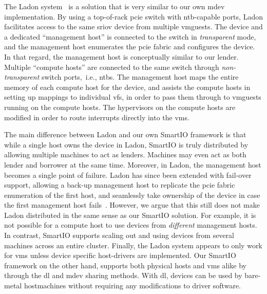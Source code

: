 The Ladon system~\cite{Tu2013} is a solution that is very similar to our own \gls{mdev} implementation.
%
By using a top-of-rack \gls{pcie} switch with \gls{ntb}-capable ports, Ladon facilitates access to the same \gls{sriov} device from multiple \glspl{vmguest}. 
%
The device and a dedicated ``management host'' is connected to the switch in \emph{transparent} mode, and the management host enumerates the \gls{pcie} fabric and configures the device.
%
In that regard, the management host is conceptually similar to our \gls{lender}.
%
Multiple ``compute hosts'' are connected to the same switch through \emph{non-transparent} switch ports,~i.e., \glspl{ntb}.
%
The management host maps the entire memory of each compute host for the device, and assists the compute hosts in setting up mappings to individual \glspl{vf}, in order to pass them through to \glspl{vmguest} running on the compute hosts.
%
The \glspl{hypervisor} on the compute hosts are modified in order to route interrupts directly into the \glspl{vm}.



The main difference between Ladon and our own SmartIO framework is that while a single host owns the device in Ladon, SmartIO is truly distributed by allowing multiple machines to act as \glspl{lender}.
%
Machines may even act as both \gls{lender} and \gls{borrower} at the same time.
%
Moreover, in Ladon, the management host becomes a single point of failure.
%
Ladon has since been extended with fail-over support, allowing a back-up management host to replicate the \gls{pcie} fabric enumeration of the first host, and seamlessly take ownership of the device in case the first management host fails~\cite{Tu2018}.
%
However, we argue that this still does not make Ladon distributed in the same sense as our SmartIO solution.
%
For example, it is not possible for a compute host to use devices from \emph{different} management hosts.
%
In contrast, SmartIO supports scaling out and using devices from several machines across an entire cluster.
%
Finally, the Ladon system appears to only work for \glspl{vm} unless device specific host-drivers are implemented.
%
Our SmartIO framework on the other hand, supports both physical \glspl{host} and \glspl{vm} alike by through the \gls{dl} and \gls{mdev} sharing methods. 
%
With \gls{dl}, devices can be used by bare-metal \glspl{hostmachine} without requiring any modifications to driver software.

